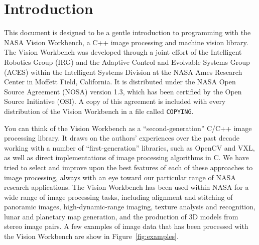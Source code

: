 \chapter{Introduction}

This document is designed to be a gentle introduction to programming
with the NASA Vision Workbench, a C++ image processing and machine
vision library.  The Vision Workbench was developed through a joint
effort of the Intelligent Robotics Group (IRG) and the Adaptive
Control and Evolvable Systems Group (ACES) within the Intelligent
Systems Division at the NASA Ames Research Center in Moffett Field,
California.  It is distributed under the NASA Open Source Agreement
(NOSA) version 1.3, which has been certified by the Open Source
Initiative (OSI).  A copy of this agreement is included with every
distribution of the Vision Workbench in a file called {\tt COPYING}.

You can think of the Vision Workbench as a ``second-generation'' C/C++
image processing library.  It draws on the authors' experiences over
the past decade working with a number of ``first-generation''
libraries, such as OpenCV and VXL, as well as direct implementations
of image processing algorithms in C.  We have tried to select and
improve upon the best features of each of these approaches to image
processing, always with an eye toward our particular range of NASA
research applications.  The Vision Workbench has been used within NASA
for a wide range of image processing tasks, including alignment and
stitching of panoramic images, high-dynamic-range imaging, texture
analysis and recognition, lunar and planetary map generation, and the
production of 3D models from stereo image pairs.  A few examples of
image data that has been processed with the Vision Workbench are show
in Figure~\ref{fig:examples}.

